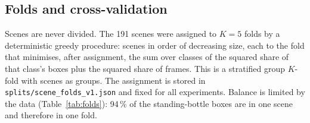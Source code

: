 \documentclass[11pt,a4paper]{article}
\begin{document}
\begin{table}[H]
  \centering
  \small
  \caption{Layout-matching terms for the pairs of Figure~\ref{fig:pairs}.}
  \label{tab:pairs}
\end{table}

\subsection{Folds and cross-validation}
\label{sec:folds}

Scenes are never divided. The 191 scenes were assigned to $K = 5$ folds by
a deterministic greedy procedure: scenes in order of decreasing size, each
to the fold that minimises, after assignment, the sum over classes of the
squared share of that class's boxes plus the squared share of frames. This
is a stratified group $K$-fold with scenes as groups. The assignment is
stored in \texttt{splits/scene\_folds\_v1.json} and fixed for all
experiments. Balance is limited by the data (Table~\ref{tab:folds}):
94\,\% of the standing-bottle boxes are in one scene and therefore in one
fold.
\end{document}
